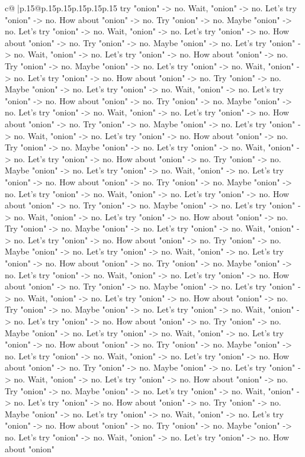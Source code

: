\documentclass{article}
\begin{document}
{\begin{supertabular}{c@{$\;$}|p{.15\linewidth}@{}p{.15\linewidth}p{.15\linewidth}p{.15\linewidth}p{.15\linewidth}p{.15\linewidth}}
{{{try "onion" {-}> no. Wait, "onion" {-}> no. Let's try "onion" {-}> no. How about "onion" {-}> no. Try "onion" {-}> no. Maybe "onion" {-}> no. Let's try "onion" {-}> no. Wait, "onion" {-}> no. Let's try "onion" {-}> no. How about "onion" {-}> no. Try "onion" {-}> no. Maybe "onion" {-}> no. Let's try "onion" {-}> no. Wait, "onion" {-}> no. Let's try "onion" {-}> no. How about "onion" {-}> no. Try "onion" {-}> no. Maybe "onion" {-}> no. Let's try "onion" {-}> no. Wait, "onion" {-}> no. Let's try "onion" {-}> no. How about "onion" {-}> no. Try "onion" {-}> no. Maybe "onion" {-}> no. Let's try "onion" {-}> no. Wait, "onion" {-}> no. Let's try "onion" {-}> no. How about "onion" {-}> no. Try "onion" {-}> no. Maybe "onion" {-}> no. Let's try "onion" {-}> no. Wait, "onion" {-}> no. Let's try "onion" {-}> no. How about "onion" {-}> no. Try "onion" {-}> no. Maybe "onion" {-}> no. Let's try "onion" {-}> no. Wait, "onion" {-}> no. Let's try "onion" {-}> no. How about "onion" {-}> no. Try "onion" {-}> no. Maybe "onion" {-}> no. Let's try "onion" {-}> no. Wait, "onion" {-}> no. Let's try "onion" {-}> no. How about "onion" {-}> no. Try "onion" {-}> no. Maybe "onion" {-}> no. Let's try "onion" {-}> no. Wait, "onion" {-}> no. Let's try "onion" {-}> no. How about "onion" {-}> no. Try "onion" {-}> no. Maybe "onion" {-}> no. Let's try "onion" {-}> no. Wait, "onion" {-}> no. Let's try "onion" {-}> no. How about "onion" {-}> no. Try "onion" {-}> no. Maybe "onion" {-}> no. Let's try "onion" {-}> no. Wait, "onion" {-}> no. Let's try "onion" {-}> no. How about "onion" {-}> no. Try "onion" {-}> no. Maybe "onion" {-}> no. Let's try "onion" {-}> no. Wait, "onion" {-}> no. Let's try "onion" {-}> no. How about "onion" {-}> no. Try "onion" {-}> no. Maybe "onion" {-}> no. Let's try "onion" {-}> no. Wait, "onion" {-}> no. Let's try "onion" {-}> no. How about "onion" {-}> no. Try "onion" {-}> no. Maybe "onion" {-}> no. Let's try "onion" {-}> no. Wait, "onion" {-}> no. Let's try "onion" {-}> no. How about "onion" {-}> no. Try "onion" {-}> no. Maybe "onion" {-}> no. Let's try "onion" {-}> no. Wait, "onion" {-}> no. Let's try "onion" {-}> no. How about "onion" {-}> no. Try "onion" {-}> no. Maybe "onion" {-}> no. Let's try "onion" {-}> no. Wait, "onion" {-}> no. Let's try "onion" {-}> no. How about "onion" {-}> no. Try "onion" {-}> no. Maybe "onion" {-}> no. Let's try "onion" {-}> no. Wait, "onion" {-}> no. Let's try "onion" {-}> no. How about "onion" {-}> no. Try "onion" {-}> no. Maybe "onion" {-}> no. Let's try "onion" {-}> no. Wait, "onion" {-}> no. Let's try "onion" {-}> no. How about "onion" {-}> no. Try "onion" {-}> no. Maybe "onion" {-}> no. Let's try "onion" {-}> no. Wait, "onion" {-}> no. Let's try "onion" {-}> no. How about "onion" {-}> no. Try "onion" {-}> no. Maybe "onion" {-}> no. Let's try "onion" {-}> no. Wait, "onion" {-}> no. Let's try "onion" {-}> no. How about "onion" {-}> no. Try "onion" {-}> no. Maybe "onion" {-}> no. Let's try "onion" {-}> no. Wait, "onion" {-}> no. Let's try "onion" {-}> no. How about "onion" {-}> no. Try "onion" {-}> no. Maybe "onion" {-}> no. Let's try "onion" {-}> no. Wait, "onion" {-}> no. Let's try "onion" {-}> no. How about "onion" }}}
\end{supertabular}}
\end{document}
